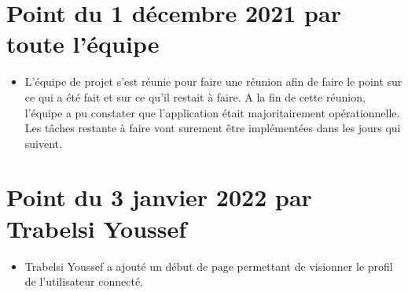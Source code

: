 \documentclass{article}
\begin{document}
\section{\huge Point du 1 décembre 2021 par toute l'équipe}

\begin{itemize}

    \item \Large L'équipe de projet s'est réunie pour faire une réunion afin de faire le point sur ce qui a été fait et sur ce qu'il restait à faire. A la fin de cette réunion, l'équipe a pu constater que l'application était majoritairement opérationnelle. Les tâches restante à faire vont surement être implémentées dans les jours qui suivent.
    
\end{itemize}

\section{\huge Point du 3 janvier 2022 par Trabelsi Youssef}

\begin{itemize}

    \item \Large Trabelsi Youssef a ajouté un début de page permettant de visionner le profil de l'utilisateur connecté.
    
\end{itemize}
\end{document}
